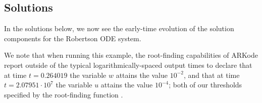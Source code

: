 \documentclass[letterpaper,10pt,english]{sphinxmanual}
\begin{document}
\subsection{Solutions}
\label{c_serial:id15}
In the solutions below, we now see the early-time evolution of the
solution components for the Robertson ODE system.
\begin{figure}[htbp]
\centering

\end{figure}

We note that when running this example, the root-finding capabilities
of ARKode report outside of the typical logarithmically-spaced output
times to declare that at time \(t=0.264019\) the variable
\(w\) attains the value \(10^{-2}\), and that at time
\(t=2.07951\cdot10^{7}\) the variable \(u\) attains the value
\(10^{-4}\); both of our thresholds specified by the root-finding
function .
\end{document}
